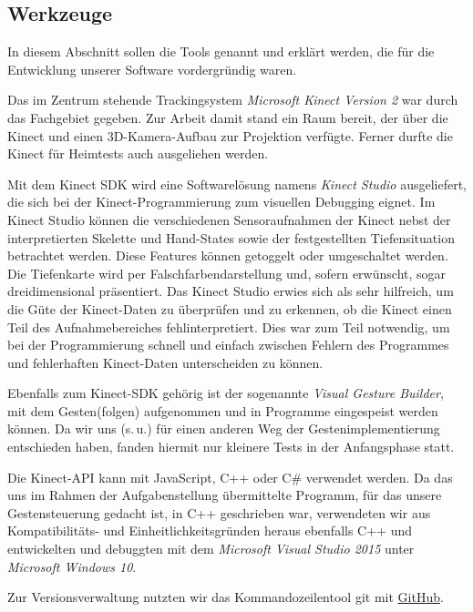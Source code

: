 	\subsection{Werkzeuge}
	In diesem Abschnitt sollen die Tools genannt und erklärt werden, die für die Entwicklung unserer Software vordergründig waren.\par
	Das im Zentrum stehende Trackingsystem \emph{Microsoft Kinect Version 2} war durch das Fachgebiet gegeben. Zur Arbeit damit stand ein Raum bereit, der über die Kinect und einen 3D-Kamera-Aufbau zur Projektion verfügte. Ferner durfte die Kinect für Heimtests auch ausgeliehen werden.\par 
	Mit dem Kinect SDK wird eine Softwarelösung namens \emph{Kinect Studio} ausgeliefert, die sich bei der Kinect-Programmierung zum visuellen Debugging eignet. Im Kinect Studio können die verschiedenen Sensoraufnahmen der Kinect nebst der interpretierten Skelette und Hand-States sowie der festgestellten Tiefensituation betrachtet werden. Diese Features können getoggelt oder umgeschaltet werden. Die Tiefenkarte wird per Falschfarbendarstellung und, sofern erwünscht, sogar dreidimensional präsentiert. Das Kinect Studio erwies sich als sehr hilfreich, um die Güte der Kinect-Daten zu überprüfen und zu erkennen, ob die Kinect einen Teil des Aufnahmebereiches fehlinterpretiert. Dies war zum Teil notwendig, um bei der Programmierung schnell und einfach zwischen Fehlern des Programmes und fehlerhaften Kinect-Daten unterscheiden zu können.\par 
	Ebenfalls zum Kinect-SDK gehörig ist der sogenannte \emph{Visual Gesture Builder}, mit dem Gesten(folgen) aufgenommen und in Programme eingespeist werden können. Da wir uns (s.\,u.) für einen anderen Weg der Gestenimplementierung entschieden haben, fanden hiermit nur kleinere Tests in der Anfangsphase statt.\par 
	Die Kinect-API kann mit JavaScript, C++ oder C\# verwendet werden. Da das uns im Rahmen der Aufgabenstellung übermittelte Programm, für das unsere Gestensteuerung gedacht ist, in C++ geschrieben war, verwendeten wir aus Kompatibilitäts- und Einheitlichkeitsgründen heraus ebenfalls C++ und entwickelten und debuggten mit dem \emph{Microsoft Visual Studio 2015} unter \emph{Microsoft Windows 10}.\par 
	Zur Versionsverwaltung nutzten wir das Kommandozeilentool git mit \href{http://github.com}{GitHub}.\par 